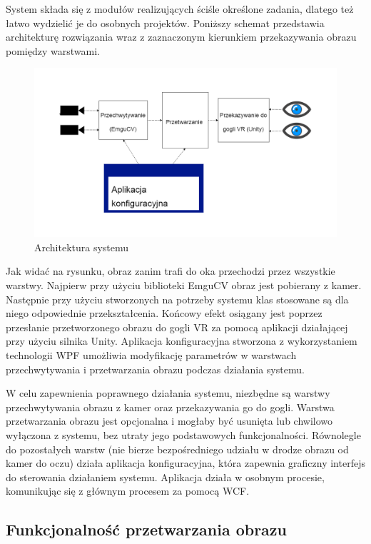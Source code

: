 \documentclass[a4paper,11pt,twoside]{report}
\theoremstyle{definition}
\begin{document}
System składa się z modułów realizujących ściśle określone zadania, dlatego też łatwo wydzielić je do osobnych projektów. Poniższy schemat przedstawia architekturę rozwiązania wraz z zaznaczonym kierunkiem przekazywania obrazu pomiędzy warstwami. 

\begin{figure}[h]
\centering
\includegraphics[scale=0.4]{architecture_schema}
\caption[Architektura systemu]{Architektura systemu}
\end{figure}

Jak widać na rysunku, obraz zanim trafi do oka przechodzi przez wszystkie warstwy. Najpierw przy użyciu biblioteki EmguCV obraz jest pobierany z kamer. Następnie przy użyciu stworzonych na potrzeby systemu klas stosowane są dla niego odpowiednie przekształcenia. Końcowy efekt osiągany jest poprzez przesłanie przetworzonego obrazu do gogli VR za pomocą aplikacji działającej przy użyciu silnika Unity. Aplikacja konfiguracyjna stworzona z wykorzystaniem technologii WPF umożliwia modyfikację parametrów w warstwach przechwytywania i przetwarzania obrazu podczas działania systemu. 

W celu zapewnienia poprawnego działania systemu, niezbędne są warstwy przechwytywania obrazu z kamer oraz przekazywania go do gogli. Warstwa przetwarzania obrazu jest opcjonalna i mogłaby być usunięta lub chwilowo wyłączona z systemu, bez utraty jego podstawowych funkcjonalności. Równolegle do pozostałych warstw (nie bierze bezpośredniego udziału w drodze obrazu od kamer do oczu) działa  aplikacja konfiguracyjna, która zapewnia graficzny interfejs do sterowania działaniem systemu. Aplikacja działa w osobnym procesie, komunikując się z głównym procesem za pomocą WCF.

\subsection{Funkcjonalność przetwarzania obrazu}
\end{document}
